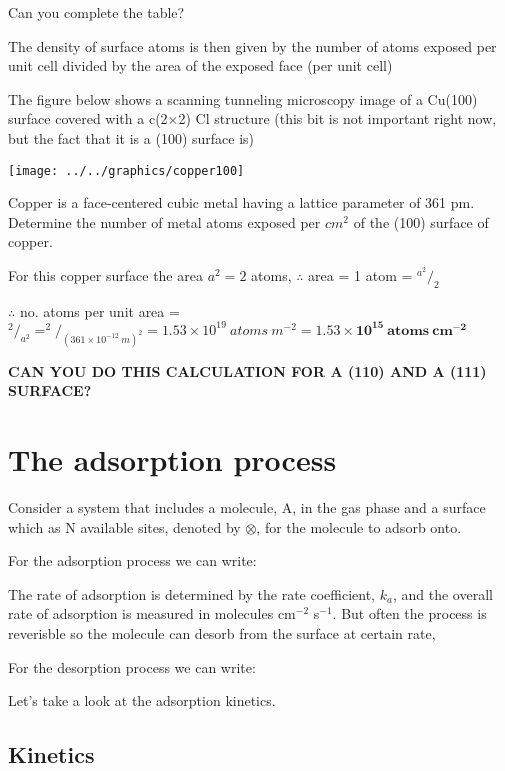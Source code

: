 \documentclass[ignorenonframetext]{beamer}
\begin{document}
Can you complete the table?

The density of surface atoms is then given by the number of atoms exposed per unit cell divided by the area of the exposed face (per unit cell)

\begin{example}
The figure below shows a scanning tunneling microscopy image of a Cu(100) surface covered with a c(2\(\times\)2) Cl structure (this bit is not important right now, but the fact that it is a (100) surface is)

\begin{center}\texttt{[image: ../../graphics/copper100]}\end{center}

Copper is a face-centered cubic metal having a lattice parameter of 361 pm. Determine the number of metal atoms exposed per \(cm^2\) of the (100) surface of copper.

For this copper surface the area \(a^2 = 2\) atoms, \(\therefore\) area = 1 atom = \(^{a^2}/_2\)

\(\therefore\) no. atoms per unit area = \(^2/_{a^2} = ^2/_{(361\times10^{-12}\ m)^2} = 1.53\times10^{19}\ atoms\ m^{-2} = \mathbf{1.53\times10^{15}\ atoms\ cm^{-2}}\)
\end{example}

\textbf{CAN YOU DO THIS CALCULATION FOR A (110) AND A (111) SURFACE?}

\section{The adsorption process}

Consider a system that includes a molecule, A, in the gas phase and a surface which as N available sites, denoted by \(\otimes\), for the molecule to adsorb onto.

For the adsorption process we can write: 

The rate of adsorption is determined by the rate coefficient, \(k_a\), and the overall rate of adsorption is measured in molecules cm\(^{-2}\) s\(^{-1}\). But often the process is reverisble so the molecule can desorb from the surface at certain rate, 

For the desorption process we can write: 

Let's take a look at the adsorption kinetics. 

\subsection{Kinetics}
\end{document}
